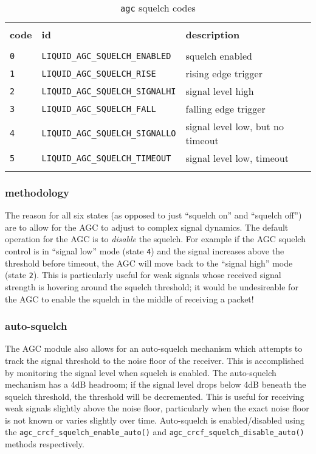 \begin{table}[!ht]
\caption{{\tt agc} squelch codes}
\label{tab:module:agc:squelch_codes}
\centering
\begin{tabular*}{0.95\textwidth}{@{\extracolsep{\fill}}lll}

\hline\hline \\[-6pt]
{\bf code} & {\bf id} & {\bf description} \\[6pt]
\hline \\[-6pt]
{\tt 0} & {\tt LIQUID\_AGC\_SQUELCH\_ENABLED}    & squelch enabled \\
{\tt 1} & {\tt LIQUID\_AGC\_SQUELCH\_RISE}       & rising edge trigger \\
{\tt 2} & {\tt LIQUID\_AGC\_SQUELCH\_SIGNALHI}   & signal level high \\
{\tt 3} & {\tt LIQUID\_AGC\_SQUELCH\_FALL}       & falling edge trigger \\
{\tt 4} & {\tt LIQUID\_AGC\_SQUELCH\_SIGNALLO}   & signal level low, but no timeout \\
{\tt 5} & {\tt LIQUID\_AGC\_SQUELCH\_TIMEOUT}    & signal level low, timeout \\ \\[-6pt]

\hline\hline
\end{tabular*}
\end{table}%


\subsubsection{methodology}
The reason for all six states (as opposed to just ``squelch on'' and ``squelch
off'') are to allow for the AGC to adjust to complex signal dynamics.
The default operation for the AGC is to {\it disable} the squelch.
For example if the AGC squelch control is in ``signal low'' mode
(state {\tt 4}) and the signal increases above the threshold before timeout,
the AGC will move back to the ``signal high'' mode (state {\tt 2}).
This is particularly useful for weak signals whose received signal strength is
hovering around the squelch threshold; it would be undesireable for the AGC to
enable the squelch in the middle of receiving a packet!

\subsubsection{auto-squelch}
The AGC module also allows for an auto-squelch mechanism which attempts to
track the signal threshold to the noise floor of the receiver.
This is accomplished by monitoring the signal level when squelch is enabled.
The auto-squelch mechanism has a 4dB headroom; if the signal level drops below
4dB beneath the squelch threshold, the threshold will be decremented.
This is useful for receiving weak signals slightly above the noise floor,
particularly when the exact noise floor is not known or varies slightly over
time.
Auto-squelch is enabled/disabled using the
{\tt agc\_crcf\_squelch\_enable\_auto()} and 
{\tt agc\_crcf\_squelch\_disable\_auto()} methods respectively.

